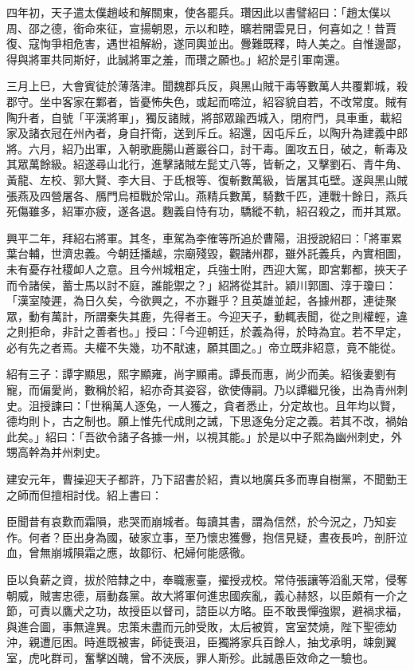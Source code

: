 \begin{pinyinscope}
四年初，天子遣太僕趙岐和解關東，使各罷兵。瓚因此以書譬紹曰：「趙太僕以周、邵之德，銜命來征，宣揚朝恩，示以和睦，曠若開雲見日，何喜如之！昔賈復、寇恂爭相危害，遇世祖解紛，遂同輿並出。釁難既釋，時人美之。自惟邊鄙，得與將軍共同斯好，此誠將軍之羞，而瓚之願也。」紹於是引軍南還。

三月上巳，大會賓徒於薄落津。聞魏郡兵反，與黑山賊干毒等數萬人共覆鄴城，殺郡守。坐中客家在鄴者，皆憂怖失色，或起而啼泣，紹容貌自若，不改常度。賊有陶升者，自號「平漢將軍」，獨反諸賊，將部眾踰西城入，閉府門，具車重，載紹家及諸衣冠在州內者，身自扞衛，送到斥丘。紹還，因屯斥丘，以陶升為建義中郎將。六月，紹乃出軍，入朝歌鹿腸山蒼巖谷口，討干毒。圍攻五日，破之，斬毒及其眾萬餘級。紹遂尋山北行，進擊諸賊左髭丈八等，皆斬之，又擊劉石、青牛角、黃龍、左校、郭大賢、李大目、于氐根等、復斬數萬級，皆屠其屯壁。遂與黑山賊張燕及四營屠各、鴈門烏桓戰於常山。燕精兵數萬，騎數千匹，連戰十餘日，燕兵死傷雖多，紹軍亦疲，遂各退。麴義自恃有功，驕縱不軌，紹召殺之，而并其眾。

興平二年，拜紹右將軍。其冬，車駕為李傕等所追於曹陽，沮授說紹曰：「將軍累葉台輔，世濟忠義。今朝廷播越，宗廟殘毀，觀諸州郡，雖外託義兵，內實相圖，未有憂存社稷卹人之意。且今州城粗定，兵強士附，西迎大駕，即宮鄴都，挾天子而令諸侯，蓄士馬以討不庭，誰能禦之？」紹將從其計。潁川郭圖、淳于瓊曰：「漢室陵遲，為日久矣，今欲興之，不亦難乎？且英雄並起，各據州郡，連徒聚眾，動有萬計，所謂秦失其鹿，先得者王。今迎天子，動輒表聞，從之則權輕，違之則拒命，非計之善者也。」授曰：「今迎朝廷，於義為得，於時為宜。若不早定，必有先之者焉。夫權不失幾，功不猒速，願其圖之。」帝立既非紹意，竟不能從。

紹有三子：譚字顯思，熙字顯雍，尚字顯甫。譚長而惠，尚少而美。紹後妻劉有寵，而偏愛尚，數稱於紹，紹亦奇其姿容，欲使傳嗣。乃以譚繼兄後，出為青州刺史。沮授諫曰：「世稱萬人逐兔，一人獲之，貪者悉止，分定故也。且年均以賢，德均則卜，古之制也。願上惟先代成則之誡，下思逐兔分定之義。若其不改，禍始此矣。」紹曰：「吾欲令諸子各據一州，以視其能。」於是以中子熙為幽州刺史，外甥高幹為并州刺史。

建安元年，曹操迎天子都許，乃下詔書於紹，責以地廣兵多而專自樹黨，不聞勤王之師而但擅相討伐。紹上書曰：

臣聞昔有哀歎而霜隕，悲哭而崩城者。每讀其書，謂為信然，於今況之，乃知妄作。何者？臣出身為國，破家立事，至乃懷忠獲釁，抱信見疑，晝夜長吟，剖肝泣血，曾無崩城隕霜之應，故鄒衍、杞婦何能感徹。

臣以負薪之資，拔於陪隸之中，奉職憲臺，擢授戎校。常侍張讓等滔亂天常，侵奪朝威，賊害忠德，扇動姦黨。故大將軍何進忠國疾亂，義心赫怒，以臣頗有一介之節，可責以鷹犬之功，故授臣以督司，諮臣以方略。臣不敢畏憚強禦，避禍求福，與進合圖，事無違異。忠策未盡而元帥受敗，太后被質，宮室焚燒，陛下聖德幼沖，親遭厄困。時進既被害，師徒喪沮，臣獨將家兵百餘人，抽戈承明，竦劍翼室，虎叱群司，奮擊凶醜，曾不浹辰，罪人斯殄。此誠愚臣效命之一驗也。


\end{pinyinscope}
